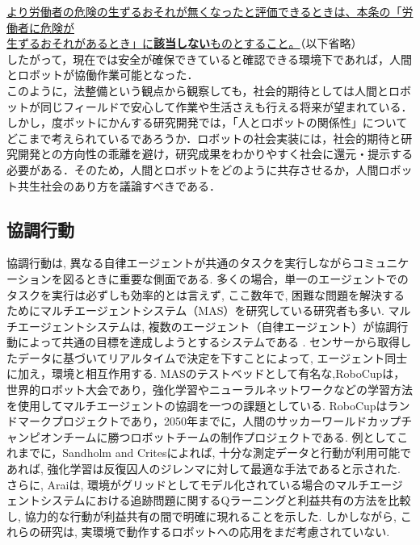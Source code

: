  \underline{より労働者の危険の生ずるおそれが無くなったと評価できるときは、本条の「労働者に危険が}\\
 \underline{生ずるおそれがあるとき」に{\bf 該当しない}ものとすること。}（以下省略）\\
したがって，現在では安全が確保できていると確認できる環境下であれば，人間とロボットが協働作業可能となった．\\
このように，法整備という観点から観察しても，社会的期待としては人間とロボットが同じフィールドで安心して作業や生活さえも行える将来が望まれている．しかし，度ボットにかんする研究開発では，「人とロボットの関係性」についてどこまで考えられているであろうか．ロボットの社会実装には，社会的期待と研究開発との方向性の乖離を避け，研究成果をわかりやすく社会に還元・提示する必要がある．そのため，人間とロボットをどのように共存させるか，人間ロボット共生社会のあり方を議論すべきである．
\subsection{協調行動}%
協調行動は, 異なる自律エージェントが共通のタスクを実行しながらコミュニケーションを図るときに重要な側面である. 多くの場合，単一のエージェントでのタスクを実行は必ずしも効率的とは言えず, ここ数年で, 困難な問題を解決するためにマルチエージェントシステム（MAS）を研究している研究者も多い. マルチエージェントシステムは, 複数のエージェント（自律エージェント）が協調行動によって共通の目標を達成しようとするシステムである .  センサーから取得したデータに基づいてリアルタイムで決定を下すことによって, エージェント同士に加え，環境と相互作用する. \cite{PS}\cite{KU}
MASのテストベッドとして有名な,RoboCupは，世界的ロボット大会であり，強化学習やニューラルネットワークなどの学習方法を使用してマルチエージェントの協調を一つの課題としている.  RoboCupはランドマークプロジェクトであり，2050年までに，人間のサッカーワールドカップチャンピオンチームに勝つロボットチームの制作プロジェクトである\cite{BS}. 
例としてこれまでに，Sandholm and Crites\cite{TWS}によれば, 十分な測定データと行動が利用可能であれば, 強化学習は反復囚人のジレンマに対して最適な手法であると示された. さらに, Arai\cite{SA}は, 環境がグリッドとしてモデル化されている場合のマルチエージェントシステムにおける追跡問題に関するQラーニングと利益共有の方法を比較し, 協力的な行動が利益共有の間で明確に現れることを示した. しかしながら, これらの研究は, 実環境で動作するロボットへの応用をまだ考慮されていない. 
